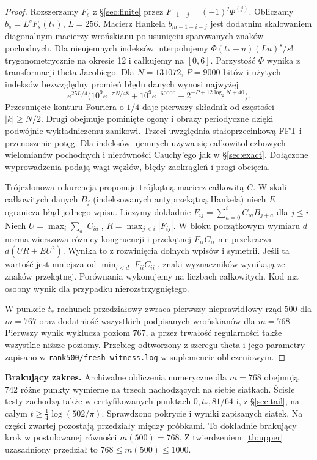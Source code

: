\documentclass[11pt,a4paper,reqno]{amsart}
\numberwithin{equation}{section}
\begin{document}
\begin{proof}
Rozszerzamy \(F_s\) z \S\ref{sec:finite} przez \(F_{-1-j}=(-1)^j\Phi^{(j)}\). Obliczamy \(b_s=L^sF_s(t_*)\), \(L=256\). Macierz Hankela \(b_{m-1-i-j}\) jest dodatnim skalowaniem diagonalnym macierzy wrońskianu po usunięciu sparowanych znaków pochodnych. Dla nieujemnych indeksów interpolujemy \(\Phi(t_*+u)(Lu)^s/s!\) trygonometrycznie na okresie 12 i całkujemy na \([0,6]\). Parzystość \(\Phi\) wynika z transformacji theta Jacobiego. Dla \(N=131072\), \(P=9000\) bitów i użytych indeksów bezwzględny promień błędu danych wynosi najwyżej \[e^{25L/4}\big(10^9e^{-\pi N/48}+10^9e^{-60000}+2^{-P+12\log_2N+40}\big).\] Przesunięcie konturu Fouriera o \(1/4\) daje pierwszy składnik od częstości \(|k|\ge N/2\). Drugi obejmuje pominięte ogony i obrazy periodyczne dzięki podwójnie wykładniczemu zanikowi. Trzeci uwzględnia stałoprzecinkową FFT i przenoszenie potęg. Dla indeksów ujemnych używa się całkowitoliczbowych wielomianów pochodnych i nierówności Cauchy'ego jak w \S\ref{sec:exact}. Dołączone wyprowadzenia podają wagi węzłów, błędy zaokrągleń i progi obcięcia.

Trójczłonowa rekurencja proponuje trójkątną macierz całkowitą \(C\). W skali całkowitych danych \(B_j\) (indeksowanych antyprzekątną Hankela) niech \(E\) ogranicza błąd jednego wpisu. Liczymy dokładnie \(F_{ij}=\sum_{a=0}^i C_{ia} B_{j+a}\) dla \(j\le i\). Niech \(U=\max_i\sum_a|C_{ia}|\), \(R=\max_{j<i}|F_{ij}|\). W bloku początkowym wymiaru \(d\) norma wierszowa różnicy kongruencji i przekątnej \(F_{ii}C_{ii}\) nie przekracza \(d(UR+EU^2)\). Wynika to z rozwinięcia dolnych wpisów i symetrii. Jeśli ta wartość jest mniejsza od \(\min_{i<d}|F_{ii}C_{ii}|\), znaki wyznaczników wynikają ze znaków przekątnej. Porównania wykonujemy na liczbach całkowitych. Kod ma osobny wynik dla przypadku nierozstrzygniętego.

W punkcie \(t_*\) rachunek przedziałowy zwraca pierwszy nieprawidłowy rząd \(500\) dla \(m=767\) oraz dodatniość wszystkich podpisanych wrońskianów dla \(m=768\). Pierwszy wynik wyklucza poziom \(767\), a przez trwałość regularności także wszystkie niższe poziomy. Przebieg odtworzony z szeregu theta i jego parametry zapisano w \texttt{rank500/fresh\_witness.log} w suplemencie obliczeniowym.
\end{proof}


\textbf{Brakujący zakres.} Archiwalne obliczenia numeryczne dla \(m=768\) obejmują 742 różne punkty wymierne na trzech nachodzących na siebie siatkach. Ścisłe testy zachodzą także w certyfikowanych punktach \(0,t_*,81/64\) i, z \S\ref{sec:tail}, na całym \(t\ge\frac14\log(502/\pi)\). Sprawdzono pokrycie i wyniki zapisanych siatek. Na części zwartej pozostają przedziały między próbkami. To dokładnie brakujący krok w postulowanej równości \(m(500)=768\). Z twierdzeniem~\ref{th:upper} uzasadniony przedział to \(768\le m(500)\le1000\).
\end{document}
